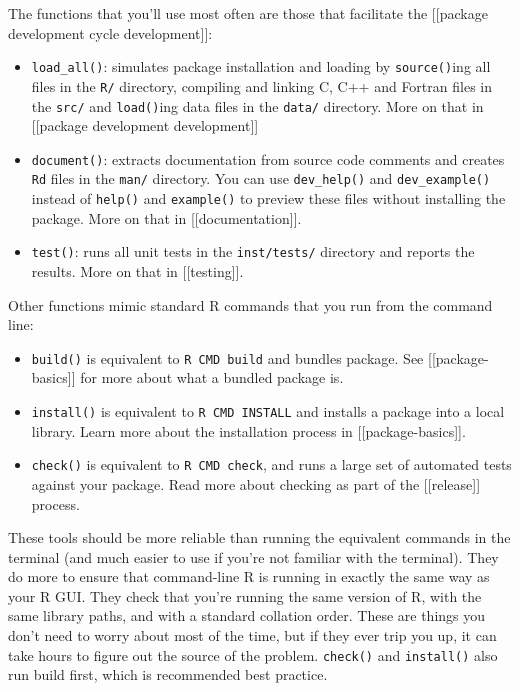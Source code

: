 The functions that you'll use most often are those that facilitate the
{[}{[}package development cycle \textbar{}development{]}{]}:

\begin{itemize}
\item
  \texttt{load\_all()}: simulates package installation and loading by
  \texttt{source()}ing all files in the \texttt{R/} directory, compiling
  and linking C, C++ and Fortran files in the \texttt{src/} and
  \texttt{load()}ing data files in the \texttt{data/} directory. More on
  that in {[}{[}package development \textbar{}development{]}{]}
\item
  \texttt{document()}: extracts documentation from source code comments
  and creates \texttt{Rd} files in the \texttt{man/} directory. You can
  use \texttt{dev\_help()} and \texttt{dev\_example()} instead of
  \texttt{help()} and \texttt{example()} to preview these files without
  installing the package. More on that in {[}{[}documentation{]}{]}.
\item
  \texttt{test()}: runs all unit tests in the \texttt{inst/tests/}
  directory and reports the results. More on that in
  {[}{[}testing{]}{]}.
\end{itemize}

Other functions mimic standard R commands that you run from the command
line:

\begin{itemize}
\item
  \texttt{build()} is equivalent to \texttt{R CMD build} and bundles
  package. See {[}{[}package-basics{]}{]} for more about what a bundled
  package is.
\item
  \texttt{install()} is equivalent to \texttt{R CMD INSTALL} and
  installs a package into a local library. Learn more about the
  installation process in {[}{[}package-basics{]}{]}.
\item
  \texttt{check()} is equivalent to \texttt{R CMD check}, and runs a
  large set of automated tests against your package. Read more about
  checking as part of the {[}{[}release{]}{]} process.
\end{itemize}

These tools should be more reliable than running the equivalent commands
in the terminal (and much easier to use if you're not familiar with the
terminal). They do more to ensure that command-line R is running in
exactly the same way as your R GUI. They check that you're running the
same version of R, with the same library paths, and with a standard
collation order. These are things you don't need to worry about most of
the time, but if they ever trip you up, it can take hours to figure out
the source of the problem. \texttt{check()} and \texttt{install()} also
run build first, which is recommended best practice.

